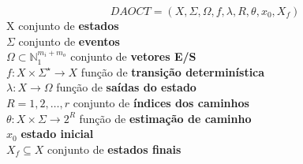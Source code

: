 \begin{frame}
\begin{definition}[DAOCT]
  \label{def:daoct}
  \small
  \[ DAOCT = (X,\Sigma,\Omega,f,\lambda,R,\theta, x_0,X_f)\]
  \indent X conjunto de \textbf{estados} \\
  \indent $\Sigma$ conjunto de \textbf{eventos}\\
  \indent $\Omega \subset \mathbb{N}_1^{m_i+m_o} $ conjunto de \textbf{vetores E/S}\\
  \indent $f:  X \times \Sigma^\star \rightarrow X$ função de  \textbf{transição determinística}\\
  \indent $\lambda : X \rightarrow \Omega$ função de  \textbf{saídas do estado}\\
  \indent $R = {1,2,\dots,r}$ conjunto de \textbf{índices dos caminhos}\\
  \indent $\theta : X \times \Sigma \rightarrow 2^R$ função de \textbf{estimação
    de caminho}\\
  \indent $x_0$ \textbf{estado inicial} \\
  \indent $X_f \subseteq X $ conjunto de \textbf{estados finais}
\end{definition}
\end{frame}

